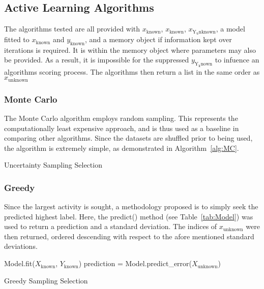 \subsection{Active Learning Algorithms}
The algorithms tested are all provided with $x_\mathrm{known}$, $x_\mathrm{known}$, $x_\mathrm{Y_unknown}$, a model fitted to $x_\mathrm{known}$ and $y_\mathrm{known}$, and a memory object if information kept over iterations is required. It is within the memory object where parameters may also be provided. As a result, it is impossible for the suppressed $y_\mathrm{Y_known}$ to infuence an algorithms scoring process. The algorithms then return a list in the same order as $x_\mathrm{unknown}$
\subsubsection{Monte Carlo}

The Monte Carlo algorithm employs random sampling. This represents the computationally least expensive approach, and is thus used as a baseline in comparing other algorithms. Since the datasets are shuffled prior to being used, the algorithm is extremely simple, as demonstrated in Algorithm~\ref{alg:MC}.

\begin{algorithm}[H]
    \caption{Uncertainty Sampling Selection}
    \label{alg:MC}\SetAlgoLined
\end{algorithm}

\subsubsection{Greedy}
Since the largest activity is sought, a methodology proposed is to simply seek the predicted highest label. Here, the predict() method (see Table~\ref{tab:Model}) was used to return a prediction and a standard deviation. The indices of $x_\mathrm{unknown}$ were then returned, ordered descending with respect to the afore mentioned standard deviations.

\begin{algorithm}[H]
    Model.fit($X_\mathrm{known}$, $Y_\mathrm{known}$)\;
    prediction = Model.predict\_error($X_\mathrm{unknown}$)\;
    \caption{Greedy Sampling Selection}
    \label{alg:greedy}\SetAlgoLined
\end{algorithm}

